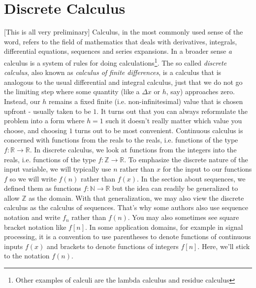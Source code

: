 \chapter{Discrete Calculus}
[This is all very preliminary] Calculus, in the most commonly used sense of the word, refers to the field of mathematics that deals with derivatives, integrals, differential equations, sequences and series expansions. In a broader sense \emph{a} calculus is a system of rules for doing calculations\footnote{Other examples of calculi are the lambda calculus and residue calculus}. The so called \emph{discrete calculus}, also known as \emph{calculus of finite differences}, is a calculus that is analogous to the usual differential and integral calculus, just that we do not go the limiting step where some quantity (like a $\Delta x$ or $h$, say) approaches zero. Instead, our $h$ remains a fixed finite (i.e. non-infinitesimal) value that is chosen upfront - usually taken to be $1$. It turns out that you can always reformulate the problem into a form where $h = 1$ such it doesn't really matter which value you choose, and choosing $1$ turns out to be most convenient. Continuous calculus is concerned with functions from the reals to the reals, i.e. functions of the type $f: \mathbb{R} \rightarrow \mathbb{R}$. In discrete calculus, we look at functions from the integers into the reals, i.e. functions of the type $f: \mathbb{Z} \rightarrow \mathbb{R}$. To emphasize the discrete nature of the input variable, we will typically use $n$ rather than $x$ for the input to our functions $f$ so we will write $f(n)$ rather than $f(x)$. In the section about sequences, we defined them as functions $f: \mathbb{N} \rightarrow \mathbb{R}$ but the idea can readily be generalized to allow $\mathbb{Z}$ as the domain. With that generalization, we may also view the discrete calculus as the calculus of sequences. That's why some authors also use sequence notation and write $f_n$ rather than $f(n)$. You may also sometimes see square bracket notation like $f[n]$. In some application domains, for example in signal processing, it is a convention to use parentheses to denote functions of continuous inputs $f(x)$ and brackets to denote functions of integers $f[n]$. Here, we'll stick to the notation $f(n)$.



